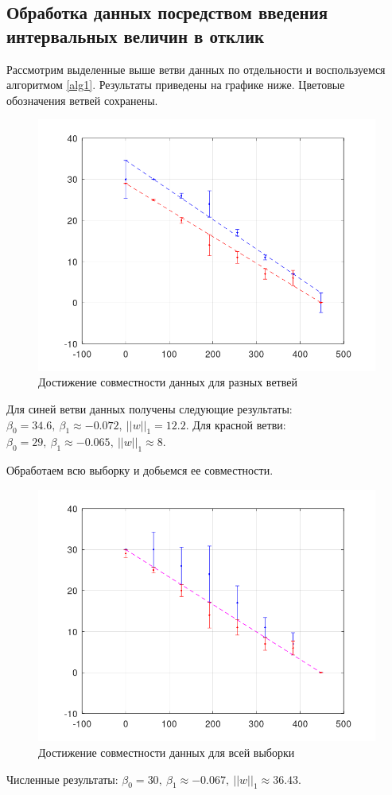 \documentclass[a4paper]{article}
\begin{document}
\subsection{Обработка данных посредством введения интервальных величин в отклик}
Рассмотрим выделенные выше ветви данных по отдельности и воспользуемся алгоритмом \ref{alg1}. Результаты приведены на графике ниже. Цветовые обозначения ветвей сохранены.
\begin{figure}[H]
    \centering
    \includegraphics[width=13cm]{img/branches.png}
    \caption{Достижение совместности данных для разных ветвей}
    \label{fig:branches}
\end{figure}
Для синей ветви данных получены следующие результаты: $\beta_0=34.6,\:\beta_1\approx-0.072,\:||w||_1=12.2$. Для красной ветви: $\beta_0=29,\:\beta_1\approx-0.065,\:||w||_1\approx8$.

Обработаем всю выборку и добьемся ее совместности.
\begin{figure}[H]
    \centering
    \includegraphics[width=13cm]{img/res_1.png}
    \caption{Достижение совместности данных для всей выборки}
    \label{fig:res_1}
\end{figure}
Численные результаты: $\beta_0=30,\:\beta_1\approx-0.067,\:||w||_1\approx36.43$.
\end{document}

